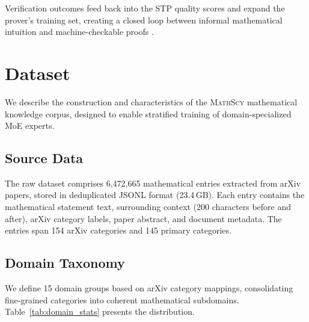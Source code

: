 \documentclass[11pt,a4paper]{article}
\newcommand{\mathscy}{\textsc{MathScy}}
\begin{document}
Verification outcomes feed back into the STP quality scores and expand the prover's training set, creating a closed loop between informal mathematical intuition and machine-checkable proofs \citep{polu2023formal, xin2024deepseekproverv2}.


\section{Dataset}
\label{sec:dataset}

We describe the construction and characteristics of the \mathscy{} mathematical knowledge corpus, designed to enable stratified training of domain-specialized MoE experts.

\subsection{Source Data}

The raw dataset comprises 6,472,665 mathematical entries extracted from arXiv papers, stored in deduplicated JSONL format (23.4\,GB). Each entry contains the mathematical statement text, surrounding context (200 characters before and after), arXiv category labels, paper abstract, and document metadata. The entries span 154 arXiv categories and 145 primary categories.

\subsection{Domain Taxonomy}

We define 15 domain groups based on arXiv category mappings, consolidating fine-grained categories into coherent mathematical subdomains. Table~\ref{tab:domain_stats} presents the distribution.
\end{document}
